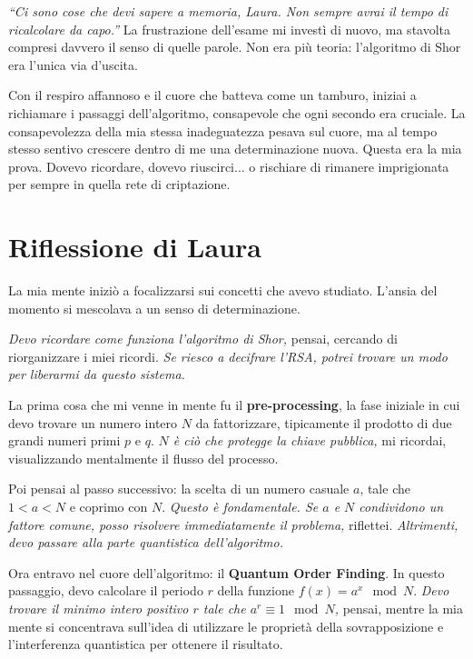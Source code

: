 \emph{“Ci sono cose che devi sapere a memoria, Laura. Non sempre avrai il tempo di ricalcolare da capo.”}
La frustrazione dell’esame mi investì di nuovo, ma stavolta compresi davvero il senso di quelle parole. Non era più teoria: l'algoritmo di Shor era l’unica via d’uscita.


Con il respiro affannoso e il cuore che batteva come un tamburo, iniziai a richiamare i passaggi dell'algoritmo, consapevole che ogni secondo era cruciale. La consapevolezza della mia stessa inadeguatezza pesava sul cuore, ma al tempo stesso sentivo crescere dentro di me una determinazione nuova. Questa era la mia prova. Dovevo ricordare, dovevo riuscirci... o rischiare di rimanere imprigionata per sempre in quella rete di criptazione.

\section{Riflessione di Laura}

 La mia mente iniziò a focalizzarsi sui concetti che avevo studiato. L'ansia del momento si mescolava a un senso di determinazione.

\emph{Devo ricordare come funziona l'algoritmo di Shor,} pensai, cercando di riorganizzare i miei ricordi. \emph{Se riesco a decifrare l'RSA, potrei trovare un modo per liberarmi da questo sistema.}

La prima cosa che mi venne in mente fu il \textbf{pre-processing}, la fase iniziale in cui devo trovare un numero intero \( N \) da fattorizzare, tipicamente il prodotto di due grandi numeri primi \( p \) e \( q \). \emph{\( N \) è ciò che protegge la chiave pubblica,} mi ricordai, visualizzando mentalmente il flusso del processo.

Poi pensai al passo successivo: la scelta di un numero casuale \( a \), tale che \( 1 < a < N \) e coprimo con \( N \). \emph{Questo è fondamentale. Se \( a \) e \( N \) condividono un fattore comune, posso risolvere immediatamente il problema,} riflettei. \emph{Altrimenti, devo passare alla parte quantistica dell'algoritmo.}

Ora entravo nel cuore dell'algoritmo: il \textbf{Quantum Order Finding}. In questo passaggio, devo calcolare il periodo \( r \) della funzione \( f(x) = a^x \mod N \). \emph{Devo trovare il minimo intero positivo \( r \) tale che \( a^r \equiv 1 \mod N \),} pensai, mentre la mia mente si concentrava sull'idea di utilizzare le proprietà della sovrapposizione e l'interferenza quantistica per ottenere il risultato.

